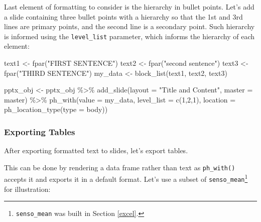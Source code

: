 \documentclass[
]{krantz}
\makeatletter
\newenvironment{Shaded}{\begin{snugshade}}{\end{snugshade}}
\newcommand{\AttributeTok}[1]{\textcolor[rgb]{0.61,0.61,0.61}{#1}}
\newcommand{\DecValTok}[1]{\textcolor[rgb]{0.06,0.06,0.06}{#1}}
\newcommand{\FunctionTok}[1]{\textcolor[rgb]{0,0,0}{#1}}
\newcommand{\NormalTok}[1]{#1}
\newcommand{\OtherTok}[1]{\textcolor[rgb]{0.37,0.37,0.37}{#1}}
\newcommand{\SpecialCharTok}[1]{\textcolor[rgb]{0,0,0}{#1}}
\newcommand{\StringTok}[1]{\textcolor[rgb]{0.5,0.5,0.5}{#1}}
\newenvironment{kframe}{%
\medskip{}
\setlength{\fboxsep}{.8em}
 \def\at@end@of@kframe{}%
 \ifinner\ifhmode%
  \def\at@end@of@kframe{\end{minipage}}%
  \begin{minipage}{\columnwidth}%
 \fi\fi%
 \def\FrameCommand##1{\hskip\@totalleftmargin \hskip-\fboxsep
 \colorbox{shadecolor}{##1}\hskip-\fboxsep
     \hskip-\linewidth \hskip-\@totalleftmargin \hskip\columnwidth}%
 \MakeFramed {\advance\hsize-\width
   \@totalleftmargin\z@ \linewidth\hsize
   \@setminipage}}%
 {\par\unskip\endMakeFramed%
 \at@end@of@kframe}
\renewenvironment{Shaded}{\begin{kframe}}{\end{kframe}}
\makeatother
\begin{document}
Last element of formatting to consider is the hierarchy in bullet points. Let's add a slide containing three bullet points with a hierarchy so that the 1st and 3rd lines are primary points, and the second line is a secondary point. Such hierarchy is informed using the \texttt{level\_list} parameter, which informs the hierarchy of each element:

\begin{Shaded}
\begin{Highlighting}[]
\NormalTok{text1 }\OtherTok{\textless{}{-}} \FunctionTok{fpar}\NormalTok{(}\StringTok{"FIRST SENTENCE"}\NormalTok{)}
\NormalTok{text2 }\OtherTok{\textless{}{-}} \FunctionTok{fpar}\NormalTok{(}\StringTok{"second sentence"}\NormalTok{)}
\NormalTok{text3 }\OtherTok{\textless{}{-}} \FunctionTok{fpar}\NormalTok{(}\StringTok{"THIRD SENTENCE"}\NormalTok{)}
\NormalTok{my\_data }\OtherTok{\textless{}{-}} \FunctionTok{block\_list}\NormalTok{(text1, text2, text3)}

\NormalTok{pptx\_obj }\OtherTok{\textless{}{-}}\NormalTok{ pptx\_obj }\SpecialCharTok{\%\textgreater{}\%}
  \FunctionTok{add\_slide}\NormalTok{(}\AttributeTok{layout =} \StringTok{"Title and Content"}\NormalTok{, }\AttributeTok{master =}\NormalTok{ master) }\SpecialCharTok{\%\textgreater{}\%} 
  \FunctionTok{ph\_with}\NormalTok{(}\AttributeTok{value =}\NormalTok{ my\_data, }\AttributeTok{level\_list =} \FunctionTok{c}\NormalTok{(}\DecValTok{1}\NormalTok{,}\DecValTok{2}\NormalTok{,}\DecValTok{1}\NormalTok{), }\AttributeTok{location =} \FunctionTok{ph\_location\_type}\NormalTok{(}\AttributeTok{type =} \StringTok{\textquotesingle{}body\textquotesingle{}}\NormalTok{))}
\end{Highlighting}
\end{Shaded}

\hypertarget{exporting-tables}{%
\subsubsection{Exporting Tables}\label{exporting-tables}}

After exporting formatted text to slides, let's export tables.

This can be done by rendering a data frame rather than text as \texttt{ph\_with()} accepts it and exports it in a default format. Let's use a subset of \texttt{senso\_mean}\footnote{\texttt{senso\_mean} was built in Section \ref{excel}.} for illustration:
\end{document}
